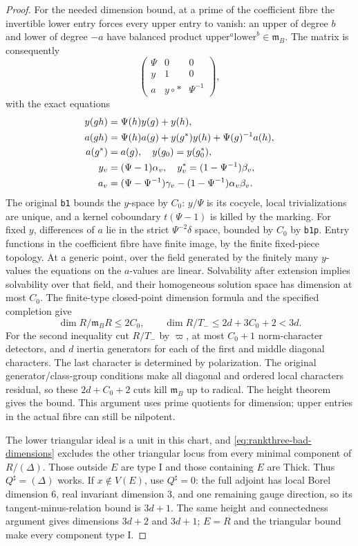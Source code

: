 \begin{proof}
For the needed dimension bound, at a prime of the coefficient fibre
the invertible lower entry forces every upper entry to vanish:
an upper of degree $b$ and lower of degree $-a$ have balanced
product $\mathrm{upper}^a\mathrm{lower}^b\in\mathfrak m_B$.
The matrix is consequently
\[
 \begin{pmatrix}\Psi&0&0\\y&1&0\\a&y\circ *&\Psi^{-1}\end{pmatrix},
\]
with the exact equations
\begin{align}
 y(gh)&=\Psi(h)y(g)+y(h),\notag\\
 a(gh)&=\Psi(h)a(g)+y(g^*)y(h)+\Psi(g)^{-1}a(h),\notag\\
 a(g^*)&=a(g),\quad y(g_0)=y(g_0^*),\notag\\
 y_v&=(\Psi-1)\alpha_v,\quad y_v^*=(1-\Psi^{-1})\beta_v,\notag\\
 a_v&=(\Psi-\Psi^{-1})\gamma_v-(1-\Psi^{-1})\alpha_v\beta_v.
 \label{eq:rankthree-low}
\end{align}
The original \texttt{b1} bounds the $y$-space by $C_0$:
$y/\Psi$ is its cocycle, local trivializations are unique, and
a kernel coboundary $t(\Psi-1)$ is killed by the marking.
For fixed $y$, differences of $a$ lie in the strict
$\Psi^{-2}\delta$ space, bounded by $C_0$ by \texttt{b1p}.
Entry functions in the coefficient fibre have finite image, by the
finite fixed-piece topology.  At a generic point, over the field
generated by the finitely many $y$-values the equations on the
$a$-values are linear.  Solvability after extension implies
solvability over that field, and their homogeneous solution space
has dimension at most $C_0$.  The finite-type closed-point dimension
formula and the specified completion give
\begin{equation}\label{eq:rankthree-bad-dimensions}
 \dim R/\mathfrak m_BR\le2C_0,
 \qquad \dim R/T_-\le2d+3C_0+2<3d.
\end{equation}
For the second inequality cut $R/T_-$ by $\varpi$, at most $C_0+1$
norm-character detectors, and $d$ inertia generators for each of
the first and middle diagonal characters.  The last character is
determined by polarization.  The original generator/class-group
conditions make all diagonal and ordered local characters residual,
so these $2d+C_0+2$ cuts kill $\mathfrak m_B$ up to radical.
The height theorem gives the bound.  This argument uses prime
quotients for dimension; upper entries in the actual fibre can
still be nilpotent.

The lower triangular ideal is a unit in this chart, and
\eqref{eq:rankthree-bad-dimensions} excludes the other triangular
locus from every minimal component of $R/(\Delta)$.
Those outside $E$ are type I and those containing $E$ are Thick.
Thus $Q^\sharp=(\Delta)$ works.  If $x\notin V(E)$, use
$Q^\sharp=0$: the full adjoint has local Borel dimension $6$,
real invariant dimension $3$, and one remaining gauge direction,
so its tangent-minus-relation bound is $3d+1$.  The same height
and connectedness argument gives dimensions $3d+2$ and $3d+1$;
$E=R$ and the triangular bound make every component type I.
\end{proof}

